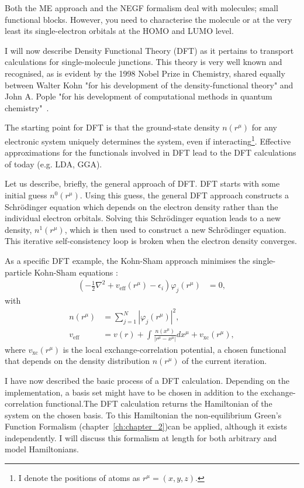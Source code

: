 Both the ME approach and the NEGF formalism deal with molecules; small functional blocks. However, you need to characterise the molecule or at the very least its single-electron orbitals at the HOMO and LUMO level. 

I will now describe Density Functional Theory (DFT) as it pertains to transport calculations for single-molecule junctions. This theory is very well known and recognised, as is evident by the 1998 Nobel Prize in Chemistry, shared equally between Walter Kohn "for his development of the density-functional theory" and John A. Pople "for his development of computational methods in quantum chemistry"~\cite{nobel1998}. 

The starting point for DFT is that the ground-state density $n(r^\mu)$ for any electronic system uniquely determines the system, even if interacting\footnote{I denote the positions of atoms as $r^\mu = (x,y,z)$.}. Effective approximations for the functionals involved in DFT lead to the DFT calculations of today (e.g. LDA, GGA). 

Let us describe, briefly, the general approach of DFT. DFT starts with some initial guess $n^0(r^\mu)$. Using this guess, the general DFT approach constructs a Schr\"odinger equation which depends on the electron density rather than the individual electron orbitals\cite{joscomp}. Solving this Schr\"odinger equation leads to a new density, $n^1(r^\mu)$, which is then used to construct a new Schr\"odinger equation. This iterative self-consistency loop is broken when the electron density converges.

As a specific DFT example, the Kohn-Sham approach minimises the single-particle Kohn-Sham equations \cite{kohnsham, joscomp}:
\begin{align}
\left( -\frac{1}{2} \nabla^2 + v_\text{eff} (r^\mu) - \epsilon_i \right) \varphi_j( r^\mu) &= 0, \label{eq:ks}
\end{align}
with
\begin{align*}
n(r^\mu) &= \sum_{j=1}^N \left| \varphi_j (r^\mu)\right|^2,\\
v_\text{eff} &= v(r) + \int \frac{n(x^\mu)}{\left|r^\mu - x^\mu\right|} dx^\mu + v_\text{xc}(r^\mu),
\end{align*}
where $v_\text{xc}(r^\mu)$ is the local exchange-correlation potential, a chosen functional that depends on the density distribution $n(r^\mu)$ of the current iteration.


I have now described the basic process of a DFT calculation. Depending on the implementation, a basis set might have to be chosen in addition to the exchange-\-correlation functional.The DFT calculation returns the Hamiltonian of the system on the chosen basis. To this Hamiltonian the non-equilibrium Green's Function Formalism (chapter~\ref{ch:chapter_2})can be applied, although it exists independently. I will discuss this formalism at length for both arbitrary and model Hamiltonians.

